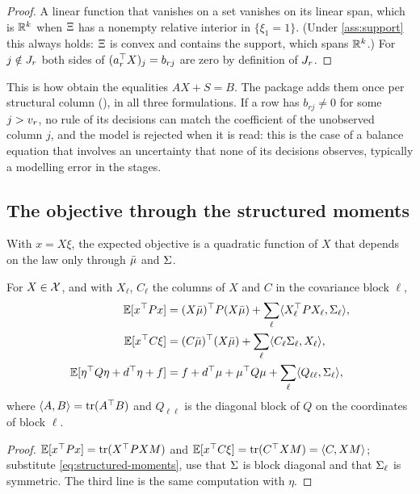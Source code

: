 \begin{proof}
A linear function that vanishes on a set vanishes on its linear span, which is $\mathbb{R}^k$ when $\Xi$ has a nonempty relative interior in $\{\xi_1 = 1\}$.
(Under \cref{ass:support} this always holds: $\Xi$ is convex and contains the support, which spans $\mathbb{R}^k$.)
For $j \notin J_r$ both sides of $(a_r^\top X)_j = b_{rj}$ are zero by definition of $J_r$.
\end{proof}

This is how \citet[Section~2.2]{KWG2011} obtain the equalities $AX + S = B$.
The package adds them once per structural column (), in all three formulations.
If a row has $b_{rj} \neq 0$ for some $j > v_r$,
no rule of its decisions can match the coefficient of the unobserved column $j$, and the model is rejected when it is read:
this is the case of a balance equation that involves an uncertainty that none of its decisions observes, typically a modelling error in the stages.

\subsection{The objective through the structured moments}

With $x = X\xi$, the expected objective is a quadratic function of $X$ that depends on the law only through $\bar\mu$ and $\Sigma$.

\begin{proposition}[Objective]
\label{prop:objective}
For $X \in \mathcal{X}$, and with $X_\ell$, $C_\ell$ the columns of $X$ and $C$ in the covariance block $\ell$,
\begin{align}
\mathbb{E}[x^\top P x] &= (X\bar\mu)^\top P (X\bar\mu) + \sum_\ell \langle X_\ell^\top P X_\ell, \Sigma_{\ell} \rangle, \label{eq:obj-quadratic}\\
\mathbb{E}[x^\top C \xi] &= (C\bar\mu)^\top (X\bar\mu) + \sum_\ell \langle C_\ell \Sigma_{\ell}, X_\ell \rangle, \label{eq:obj-linear}\\
\mathbb{E}[\eta^\top Q\eta + d^\top\eta + f] &= f + d^\top\mu + \mu^\top Q \mu + \sum_\ell \langle Q_{\ell\ell}, \Sigma_{\ell} \rangle, \label{eq:obj-constant}
\end{align}
where $\langle A, B \rangle = \operatorname{tr}(A^\top B)$ and $Q_{\ell\ell}$ is the diagonal block of $Q$ on the coordinates of block $\ell$.
\end{proposition}

\begin{proof}
$\mathbb{E}[x^\top P x] = \operatorname{tr}(X^\top P X M)$ and $\mathbb{E}[x^\top C\xi] = \operatorname{tr}(C^\top X M) = \langle C, XM \rangle$;
substitute \eqref{eq:structured-moments}, use that $\Sigma$ is block diagonal and that $\Sigma_{\ell}$ is symmetric.
The third line is the same computation with $\eta$.
\end{proof}

